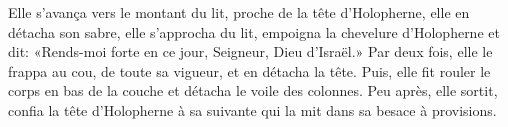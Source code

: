 Elle s'avança vers le montant du lit, proche de la tête d'Holopherne,
	elle en détacha son sabre, elle s'approcha du lit,
	empoigna la chevelure d'Holopherne et dit:
	«Rends-moi forte en ce jour, Seigneur, Dieu d'Israël.»
Par deux fois, elle le frappa au cou, de toute sa vigueur, et en détacha la tête.
Puis, elle fit rouler le corps en bas de la couche et détacha le voile des colonnes.
Peu après, elle sortit,
	confia la tête d'Holopherne à sa suivante qui la mit dans sa besace à provisions.
